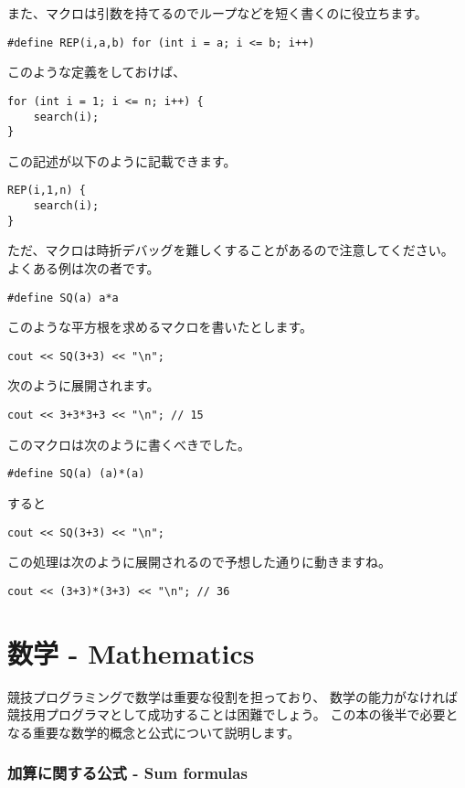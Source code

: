 また、マクロは引数を持てるのでループなどを短く書くのに役立ちます。

\begin{lstlisting}
#define REP(i,a,b) for (int i = a; i <= b; i++)
\end{lstlisting}
このような定義をしておけば、
\begin{lstlisting}
for (int i = 1; i <= n; i++) {
    search(i);
}
\end{lstlisting}
この記述が以下のように記載できます。
\begin{lstlisting}
REP(i,1,n) {
    search(i);
}
\end{lstlisting}

ただ、マクロは時折デバッグを難しくすることがあるので注意してください。
よくある例は次の者です。
\begin{lstlisting}
#define SQ(a) a*a
\end{lstlisting}
このような平方根を求めるマクロを書いたとします。
\begin{lstlisting}
cout << SQ(3+3) << "\n";
\end{lstlisting}
次のように展開されます。
\begin{lstlisting}
cout << 3+3*3+3 << "\n"; // 15
\end{lstlisting}

このマクロは次のように書くべきでした。
\begin{lstlisting}
#define SQ(a) (a)*(a)
\end{lstlisting}
すると
\begin{lstlisting}
cout << SQ(3+3) << "\n";
\end{lstlisting}
この処理は次のように展開されるので予想した通りに動きますね。
\begin{lstlisting}
cout << (3+3)*(3+3) << "\n"; // 36
\end{lstlisting}


\section{数学 - Mathematics}

競技プログラミングで数学は重要な役割を担っており、
数学の能力がなければ競技用プログラマとして成功することは困難でしょう。
この本の後半で必要となる重要な数学的概念と公式について説明します。

\subsubsection{加算に関する公式 - Sum formulas}


